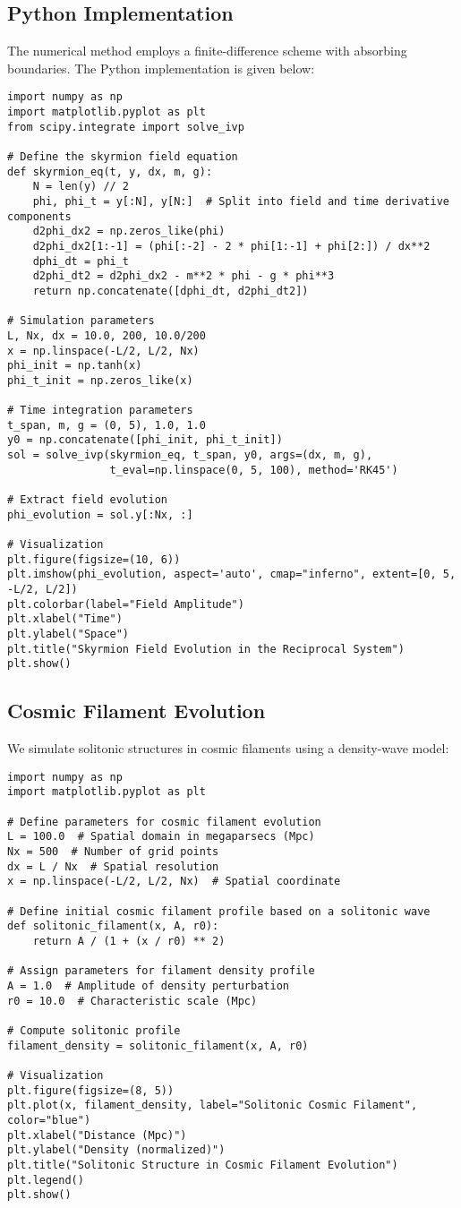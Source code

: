 \documentclass{article}
\begin{document}
\subsection{Python Implementation}
The numerical method employs a finite-difference scheme with absorbing boundaries. The Python implementation is given below:
\begin{verbatim}
import numpy as np
import matplotlib.pyplot as plt
from scipy.integrate import solve_ivp

# Define the skyrmion field equation
def skyrmion_eq(t, y, dx, m, g):
    N = len(y) // 2
    phi, phi_t = y[:N], y[N:]  # Split into field and time derivative components
    d2phi_dx2 = np.zeros_like(phi)
    d2phi_dx2[1:-1] = (phi[:-2] - 2 * phi[1:-1] + phi[2:]) / dx**2
    dphi_dt = phi_t
    d2phi_dt2 = d2phi_dx2 - m**2 * phi - g * phi**3
    return np.concatenate([dphi_dt, d2phi_dt2])

# Simulation parameters
L, Nx, dx = 10.0, 200, 10.0/200
x = np.linspace(-L/2, L/2, Nx)
phi_init = np.tanh(x)
phi_t_init = np.zeros_like(x)

# Time integration parameters
t_span, m, g = (0, 5), 1.0, 1.0
y0 = np.concatenate([phi_init, phi_t_init])
sol = solve_ivp(skyrmion_eq, t_span, y0, args=(dx, m, g),
                t_eval=np.linspace(0, 5, 100), method='RK45')

# Extract field evolution
phi_evolution = sol.y[:Nx, :]

# Visualization
plt.figure(figsize=(10, 6))
plt.imshow(phi_evolution, aspect='auto', cmap="inferno", extent=[0, 5, -L/2, L/2])
plt.colorbar(label="Field Amplitude")
plt.xlabel("Time")
plt.ylabel("Space")
plt.title("Skyrmion Field Evolution in the Reciprocal System")
plt.show()
\end{verbatim}

\subsection{Cosmic Filament Evolution}
We simulate solitonic structures in cosmic filaments using a density-wave model:
\begin{verbatim}
import numpy as np
import matplotlib.pyplot as plt

# Define parameters for cosmic filament evolution
L = 100.0  # Spatial domain in megaparsecs (Mpc)
Nx = 500  # Number of grid points
dx = L / Nx  # Spatial resolution
x = np.linspace(-L/2, L/2, Nx)  # Spatial coordinate

# Define initial cosmic filament profile based on a solitonic wave
def solitonic_filament(x, A, r0):
    return A / (1 + (x / r0) ** 2)

# Assign parameters for filament density profile
A = 1.0  # Amplitude of density perturbation
r0 = 10.0  # Characteristic scale (Mpc)

# Compute solitonic profile
filament_density = solitonic_filament(x, A, r0)

# Visualization
plt.figure(figsize=(8, 5))
plt.plot(x, filament_density, label="Solitonic Cosmic Filament", color="blue")
plt.xlabel("Distance (Mpc)")
plt.ylabel("Density (normalized)")
plt.title("Solitonic Structure in Cosmic Filament Evolution")
plt.legend()
plt.show()
\end{verbatim}
\end{document}
